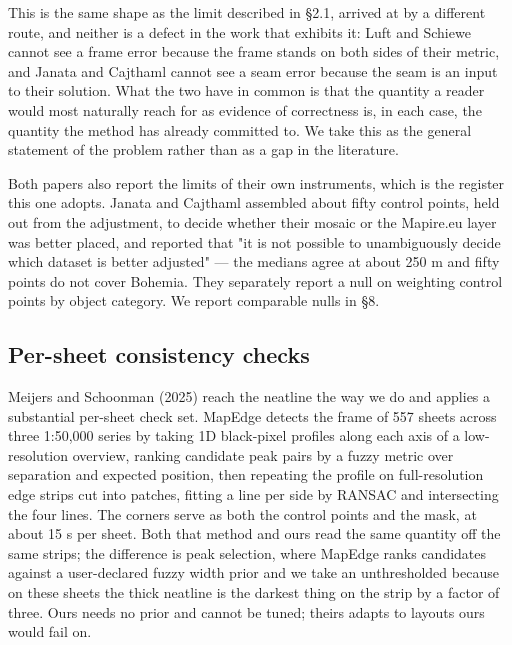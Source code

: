 \documentclass[11pt,a4paper]{article}
\begin{document}
This is the same shape as the limit described in §2.1, arrived at by a different route, and neither is a defect in the work that exhibits it: Luft and Schiewe cannot see a frame error because the frame stands on both sides of their metric, and Janata and Cajthaml cannot see a seam error because the seam is an input to their solution. What the two have in common is that the quantity a reader would most naturally reach for as evidence of correctness is, in each case, the quantity the method has already committed to. We take this as the general statement of the problem rather than as a gap in the literature.

Both papers also report the limits of their own instruments, which is the register this one adopts. Janata and Cajthaml assembled about fifty control points, held out from the adjustment, to decide whether their mosaic or the Mapire.eu layer was better placed, and reported that "it is not possible to unambiguously decide which dataset is better adjusted" — the medians agree at about 250 m and fifty points do not cover Bohemia. They separately report a null on weighting control points by object category. We report comparable nulls in §8.

\subsection{Per-sheet consistency checks}

Meijers and Schoonman (2025) reach the neatline the way we do and applies a substantial per-sheet check set. MapEdge detects the frame of 557 sheets across three 1:50,000 series by taking 1D black-pixel profiles along each axis of a low-resolution overview, ranking candidate peak pairs by a fuzzy metric over separation and expected position, then repeating the profile on full-resolution edge strips cut into patches, fitting a line per side by RANSAC and intersecting the four lines. The corners serve as both the control points and the mask, at about 15 s per sheet. Both that method and ours read the same quantity off the same strips; the difference is peak selection, where MapEdge ranks candidates against a user-declared fuzzy width prior and we take an unthresholded \texttt{} because on these sheets the thick neatline is the darkest thing on the strip by a factor of three. Ours needs no prior and cannot be tuned; theirs adapts to layouts ours would fail on.
\end{document}
